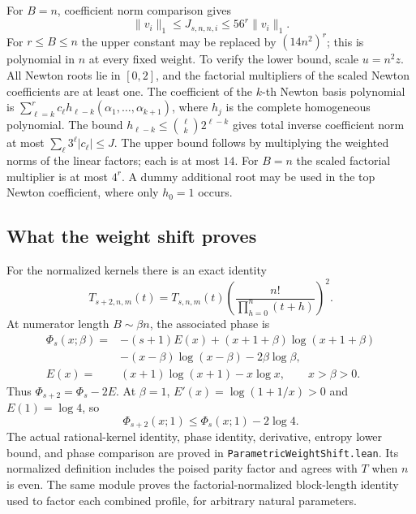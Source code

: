 \documentclass[11pt]{article}
\theoremstyle{remark}
\begin{document}
For \(B=n\), coefficient norm comparison gives
\begin{equation}
 \|v_i\|_1\le J_{s,n,n,i}\le56^r\|v_i\|_1.
 \label{eq:parametric-norm}
\end{equation}
For \(r\le B\le n\) the upper constant may be replaced by
\((14n^2)^r\); this is polynomial in \(n\) at every fixed weight.
To verify the lower bound, scale \(u=n^2z\). All Newton roots lie in
\([0,2]\), and the factorial multipliers of the scaled Newton coefficients
are at least one. The coefficient of the \(k\)-th Newton basis polynomial
is \(\sum_{\ell=k}^r c_\ell h_{\ell-k}(\alpha_1,\ldots,\alpha_{k+1})\),
where \(h_j\) is the complete homogeneous polynomial. The bound
\(h_{\ell-k}\le\binom\ell k2^{\ell-k}\) gives total inverse coefficient
norm at most \(\sum_\ell3^\ell|c_\ell|\le J\).
The upper bound follows by multiplying the weighted norms of the
linear factors; each is at most \(14\). For \(B=n\) the scaled factorial
multiplier is at most \(4^r\). A dummy additional root may be used in
the top Newton coefficient, where only \(h_0=1\) occurs.

\subsection{What the weight shift proves}
For the normalized kernels there is an exact identity
\begin{equation}
 T_{s+2,n,m}(t)=T_{s,n,m}(t)
       \left(\frac{n!}{\prod_{h=0}^n(t+h)}\right)^2.
 \label{eq:parametric-weight-shift}
\end{equation}
At numerator length \(B\sim\beta n\), the associated phase is
\begin{align*}
 \Phi_s(x;\beta)={}&-(s+1)E(x)
 +(x+1+\beta)\log(x+1+\beta)\\
 &-(x-\beta)\log(x-\beta)-2\beta\log\beta,\\
 E(x)={}&(x+1)\log(x+1)-x\log x,
 \qquad x>\beta>0.
\end{align*}
Thus \(\Phi_{s+2}=\Phi_s-2E\). At \(\beta=1\),
\(E'(x)=\log(1+1/x)>0\) and \(E(1)=\log4\), so
\[
 \Phi_{s+2}(x;1)\le\Phi_s(x;1)-2\log4.
\]
The actual rational-kernel identity, phase identity, derivative,
entropy lower bound, and phase comparison are proved in
\texttt{ParametricWeightShift.lean}. Its normalized definition includes
the poised parity factor and agrees with \(T\) when \(n\) is even.
The same module proves the factorial-normalized block-length identity
used to factor each combined profile, for arbitrary natural parameters.
\end{document}
